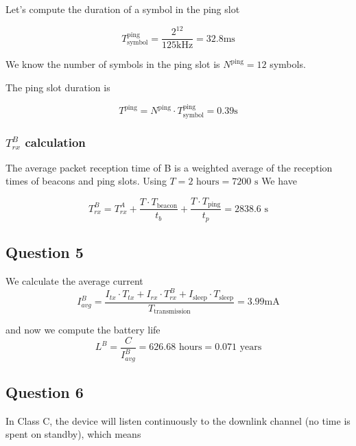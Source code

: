 \documentclass[]{article}
\begin{document}
	Let's compute the duration of a symbol in the ping slot
	
	\begin{equation}
		T_{\text{symbol}}^{\text{ping}} = \frac{2^{12}}{125\text{kHz}} = 32.8\text{ms}
	\end{equation}
	
	We know the number of symbols in the ping slot is $N^{\text{ping}} = 12$ symbols.
	
	The ping slot duration is
	
	\begin{equation}
		T^{\text{ping}} = N^{\text{ping}} \cdot T_{\text{symbol}}^{\text{ping}} = 0.39\text{s}
	\end{equation}
	
	\subsubsection*{$T_{rx}^B$ calculation}
	
	The average packet reception time of B is a weighted average of the reception times of beacons and ping slots. Using $T = 2\text{ hours} = 7200\text{ s}$ We have
	
	\begin{equation}
		T_{rx}^B = T_{rx}^A + \frac{T \cdot T_{\text{beacon}}}{t_b} + \frac{T \cdot T_{\text{ping}}}{t_p} = 2838.6 \text{ s}
	\end{equation}
	
	\subsection*{Question 5}
	
	We calculate the average current
	\begin{equation}
		I_{avg}^B = \frac{I_{tx} \cdot T_{tx} + I_{rx} \cdot T_{rx}^B + I_{\text{sleep}} \cdot T_{\text{sleep}}}{T_{\text{transmission}}} = 3.99 \mathrm{mA}
	\end{equation}
	
	and now we compute the battery life
	\begin{equation}
		L^B = \frac{C}{I_{avg}^B} = 626.68 \text{ hours} = 0.071 \text{ years}
	\end{equation}
	
	\subsection*{Question 6}
	
	In Class C, the device will listen continuously to the downlink channel (no time is spent on standby), which means 
	
\end{document}
